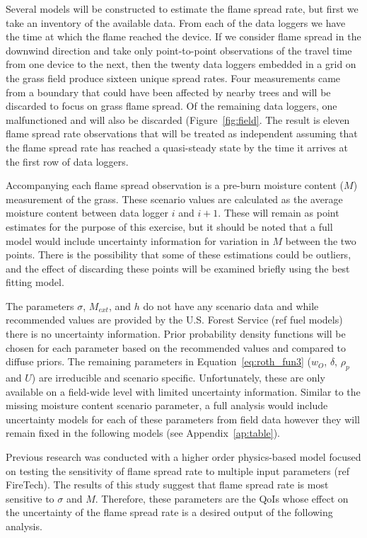 \documentclass[11pt]{article}
\begin{document}
Several models will be constructed to estimate the flame spread rate, but first we take an inventory of the available data. From each of the data loggers we have the time at which the flame reached the device. If we consider flame spread in the downwind direction and take only point-to-point observations of the travel time from one device to the next, then the twenty data loggers embedded in a grid on the grass field produce sixteen unique spread rates. Four measurements came from a boundary that could have been affected by nearby trees and will be discarded to focus on grass flame spread. Of the remaining data loggers, one malfunctioned and will also be discarded (Figure~\ref{fig:field}. The result is eleven flame spread rate observations that will be treated as independent assuming that the flame spread rate has reached a quasi-steady state by the time it arrives at the first row of data loggers.

Accompanying each flame spread observation is a pre-burn moisture content ($M$) measurement of the grass. These scenario values are calculated as the average moisture content between data logger $i$ and $i+1$. These will remain as point estimates for the purpose of this exercise, but it should be noted that a full model would include uncertainty information for variation in $M$ between the two points. There is the possibility that some of these estimations could be outliers, and the effect of discarding these points will be examined briefly using the best fitting model.

The parameters $\sigma$, $M_{ext}$, and $h$ do not have any scenario data and while recommended values are provided by the U.S. Forest Service (ref fuel models) there is no uncertainty information. Prior probability density functions will be chosen for each parameter based on the recommended values and compared to diffuse priors. The remaining parameters in Equation~\ref{eq:roth_fun3} ($w_O$, $\delta$, $\rho_p$ and $U$) are irreducible and scenario specific. Unfortunately, these are only available on a field-wide level with limited uncertainty information. Similar to the missing moisture content scenario parameter, a full analysis would include uncertainty models for each of these parameters from field data however they will remain fixed in the following models (see Appendix~\ref{ap:table}).

Previous research was conducted with a higher order physics-based model focused on testing the sensitivity of flame spread rate to multiple input parameters (ref FireTech). The results of this study suggest that flame spread rate is most sensitive to $\sigma$ and $M$. Therefore, these parameters are the QoIs whose effect on the uncertainty of the flame spread rate is a desired output of the following analysis.
\end{document}
